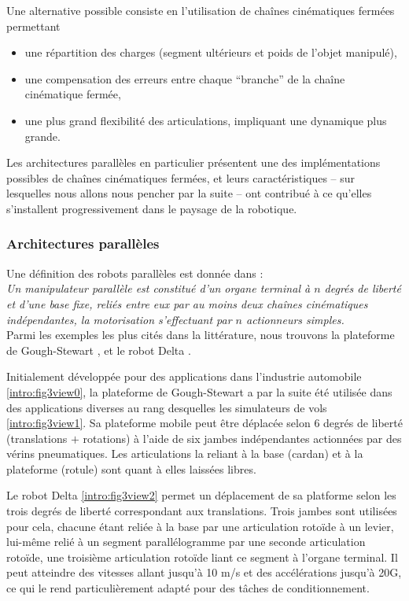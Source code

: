 Une alternative possible consiste en l'utilisation de chaînes cinématiques fermées permettant
\begin{itemize}
 \item une répartition des charges (segment ultérieurs et poids de l'objet manipulé),
 \item une compensation des erreurs entre chaque ``branche'' de la chaîne cinéma\-tique fermée,
 \item une plus grand flexibilité des articulations, impliquant une dynamique plus grande.
\end{itemize}

Les architectures parallèles en particulier présentent une des implémentations possibles de chaînes cinématiques fermées, et leurs caractéristiques -- sur lesquel\-les nous allons nous pencher par la suite -- ont contribué à ce qu'elles s'installent progressivement dans le paysage de la robotique.


\subsubsection{Architectures parallèles}

Une définition des robots parallèles est donnée dans \cite{merlet1997robots} :\\
{\it Un manipulateur parallèle est constitué d’un organe terminal à $n$ degrés de li\-berté et d’une base fixe, reliés entre eux par au moins deux chaînes
cinématiques indépendantes, la motorisation s’effectuant par $n$ actionneurs simples.}\\

Parmi les exemples les plus cités dans la littérature, nous trouvons la plateforme de Gough-Stewart \cite{1956:Gough}, \cite{1965:Stewart} et le robot Delta \cite{1988:Clavel}.

Initialement développée pour des applications dans l'industrie automobile \ref{intro:fig3view0}, la plateforme de Gough-Stewart a par la suite été utilisée dans des applications diverses au rang desquelles les simulateurs de vols \ref{intro:fig3view1}. Sa plateforme mobile peut être déplacée selon 6 degrés de liberté (translations $+$ rotations) à l'aide de six jambes indépendantes actionnées par des vérins pneumatiques. Les articulations la reliant à la base (cardan) et à la plateforme (rotule) sont quant à elles laissées libres.

Le robot Delta \ref{intro:fig3view2} permet un déplacement de sa platforme selon les trois degrés de liberté correspondant aux translations. Trois jambes sont utilisées pour cela, chacune étant reliée à la base par une articulation rotoïde à un levier, lui-même relié à un segment parallélogramme par une seconde articulation rotoïde, une troisième articulation rotoïde liant ce segment à l'organe terminal. Il peut atteindre des vitesses allant jusqu'à 10 m/s et des accélérations jusqu'à 20G, ce qui le rend particulièrement adapté pour des tâches de conditionnement. 

